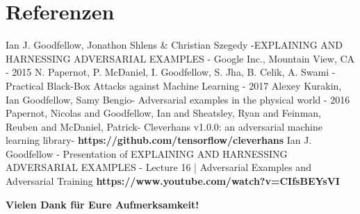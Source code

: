 \documentclass[9pt]{beamer}
\begin{document}
\section{Referenzen} 
	\vspace*{0.5cm}
\begin{thebibliography}{10}
	Ian J. Goodfellow, Jonathon Shlens \& Christian Szegedy -\newline EXPLAINING AND HARNESSING
	ADVERSARIAL EXAMPLES - Google Inc., Mountain View, CA - 2015
	N. Papernot, P. McDaniel, I. Goodfellow, S. Jha, B. Celik, A. Swami
	 - Practical Black-Box Attacks against Machine Learning - 2017
	  Alexey Kurakin, Ian Goodfellow, Samy Bengio- \newline
	 Adversarial examples in the physical world - 2016
	  Papernot, Nicolas and Goodfellow, Ian and Sheatsley, Ryan and Feinman, Reuben and McDaniel, Patrick- \newline
  	 Cleverhans v1.0.0: an adversarial machine learning library- \newline
  	 \textbf{https://github.com/tensorflow/cleverhans}
	   Ian J. Goodfellow - Presentation of EXPLAINING AND HARNESSING
	  ADVERSARIAL EXAMPLES - \newline
	  Lecture 16 | Adversarial Examples and Adversarial Training \newline
	  \textbf{https://www.youtube.com/watch?v=CIfsBEYsVI}
\end{thebibliography}
\begin{frame}
\Huge \centering \textbf{Vielen Dank für Eure Aufmerksamkeit!}
\end{frame}
\end{document}
